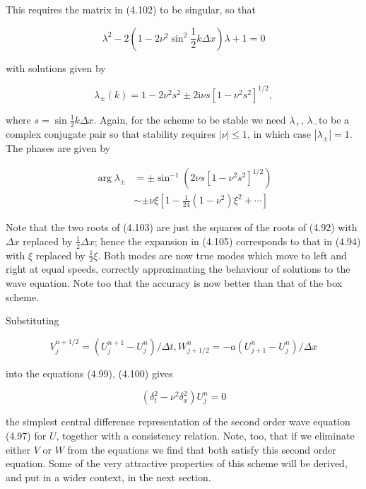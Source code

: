\documentclass[10pt]{article}
\begin{document}
This requires the matrix in (4.102) to be singular, so that

\[
\lambda^{2}-2\left(1-2 \nu^{2} \sin ^{2} \frac{1}{2} k \Delta x\right) \lambda+1=0
\]

with solutions given by

\[
\lambda_{ \pm}(k)=1-2 \nu^{2} s^{2} \pm 2 \mathrm{i} \nu s\left[1-\nu^{2} s^{2}\right]^{1 / 2},
\]

where \(s=\sin \frac{1}{2} k \Delta x\). Again, for the scheme to be stable we need \(\lambda_{+}\), \(\lambda_{-}\)to be a complex conjugate pair so that stability requires \(|\nu| \leq 1\), in which case \(\left|\lambda_{ \pm}\right|=1\). The phases are given by

\[
\begin{aligned}
\arg \lambda_{ \pm} & = \pm \sin ^{-1}\left(2 \nu s\left[1-\nu^{2} s^{2}\right]^{1 / 2}\right) \\
& \sim \pm \nu \xi\left[1-\frac{1}{24}\left(1-\nu^{2}\right) \xi^{2}+\cdots\right]
\end{aligned}
\]

Note that the two roots of (4.103) are just the squares of the roots of (4.92) with \(\Delta x\) replaced by \(\frac{1}{2} \Delta x\); hence the expansion in (4.105) corresponds to that in (4.94) with \(\xi\) replaced by \(\frac{1}{2} \xi\). Both modes are now true modes which move to left and right at equal speeds, correctly approximating the behaviour of solutions to the wave equation. Note too that the accuracy is now better than that of the box scheme.

Substituting

\[
V_{j}^{n+1 / 2}=\left(U_{j}^{n+1}-U_{j}^{n}\right) / \Delta t, W_{j+1 / 2}^{n}=-a\left(U_{j+1}^{n}-U_{j}^{n}\right) / \Delta x
\]

into the equations (4.99), (4.100) gives

\[
\left(\delta_{t}^{2}-\nu^{2} \delta_{x}^{2}\right) U_{j}^{n}=0
\]

the simplest central difference representation of the second order wave equation (4.97) for \(U\), together with a consistency relation. Note, too, that if we eliminate either \(V\) or \(W\) from the equations we find that both satisfy this second order equation. Some of the very attractive properties of this scheme will be derived, and put in a wider context, in the next section.
\end{document}
